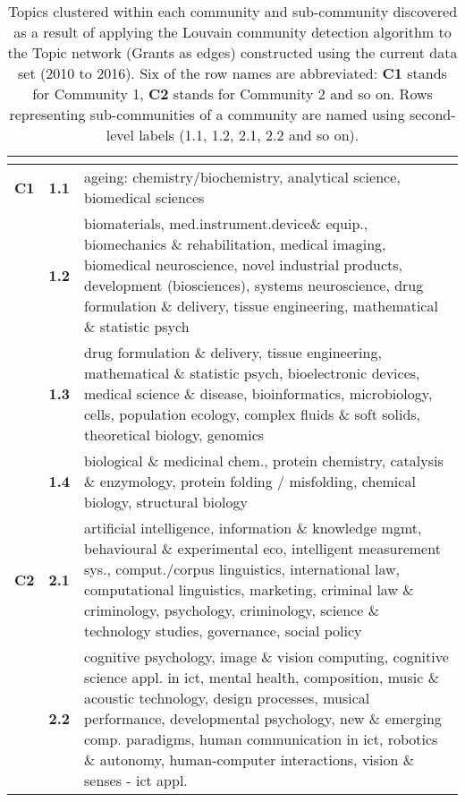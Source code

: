 \begin{spacing}{0.9}
\begin{longtable}[r]{r|r|p{11.5cm}}
\caption[Topics clustered within each community and sub-community discovered in the Topic network (Grants as edges) constructed using the current data set (2010 to 2016)]{Topics clustered within each community and sub-community discovered as a result of applying the Louvain community detection algorithm to the Topic network (Grants as edges) constructed using the current data set (2010 to 2016). Six of the row names are abbreviated: \textbf{C1} stands for Community 1, \textbf{C2} stands for Community 2 and so on. Rows representing sub-communities of a community are named using second-level labels (1.1, 1.2, 2.1, 2.2 and so on).}\\
\label{table:topic_a_current_clusters_appendix}
{} & {}\\
\hline
\endhead
\textbf{C1}
& \textbf{1.1} & {ageing: chemistry/biochemistry, analytical science, biomedical sciences}\\
& \textbf{1.2} & {biomaterials, med.instrument.device\& equip., biomechanics \& rehabilitation, medical imaging, biomedical neuroscience, novel industrial products, development (biosciences), systems neuroscience, drug formulation \& delivery, tissue engineering, mathematical \& statistic psych}\\
& \textbf{1.3} & {drug formulation \& delivery, tissue engineering, mathematical \& statistic psych, bioelectronic devices, medical science \& disease, bioinformatics, microbiology, cells, population ecology, complex fluids \& soft solids, theoretical biology, genomics}\\
& \textbf{1.4} & {biological \& medicinal chem., protein chemistry, catalysis \& enzymology, protein folding / misfolding, chemical biology, structural biology}\\
\hline
\textbf{C2}
& \textbf{2.1} & {artificial intelligence, information \& knowledge mgmt, behavioural \& experimental eco, intelligent measurement sys., comput./corpus linguistics, international law, computational linguistics, marketing, criminal law \& criminology, psychology, criminology, science \& technology studies, governance, social policy}\\
& \textbf{2.2} & {cognitive psychology, image \& vision computing, cognitive science appl. in ict, mental health, composition, music \& acoustic technology, design processes, musical performance, developmental psychology, new \& emerging comp. paradigms, human communication in ict, robotics \& autonomy, human-computer interactions, vision \& senses - ict appl.}\\

\end{longtable}
\end{spacing}
